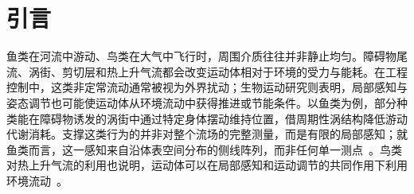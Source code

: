 
\section{引言}\label{sec:ch5_intro}

鱼类在河流中游动、鸟类在大气中飞行时，周围介质往往并非静止均匀。障碍物尾流、涡街、剪切层和热上升气流都会改变运动体相对于环境的受力与能耗。在工程控制中，这类非定常流动通常被视为外界扰动；生物运动研究则表明，局部感知与姿态调节也可能使运动体从环境流动中获得推进或节能条件。以鱼类为例，部分种类能在障碍物诱发的涡街中通过特定身体摆动维持位置，借周期性涡结构降低游动代谢消耗。支撑这类行为的并非对整个流场的完整测量，而是有限的局部感知；就鱼类而言，这一感知来自沿体表空间分布的侧线阵列，而非任何单一测点~\citep{liao2022efficiency,coombs2020rheotaxis}。鸟类对热上升气流的利用也说明，运动体可以在局部感知和运动调节的共同作用下利用环境流动~\citep{flato2024soaring}。

